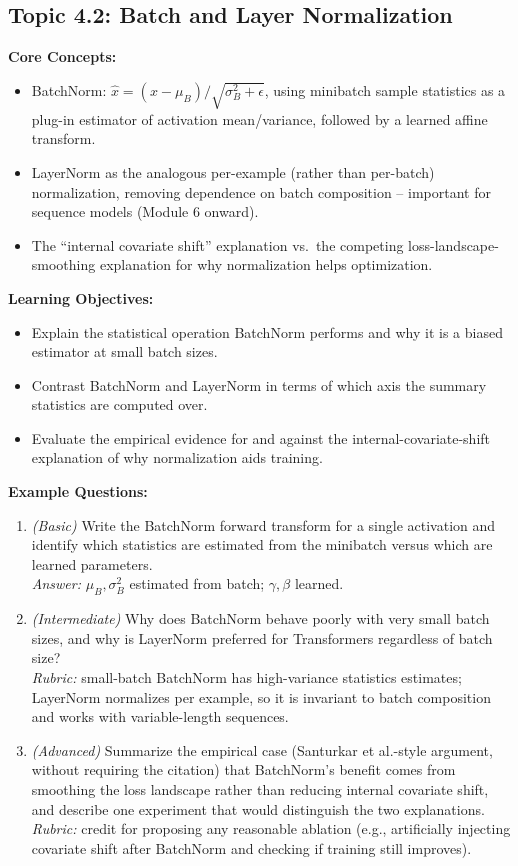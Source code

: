 \documentclass[11pt]{article}
\begin{document}
\subsection{Topic 4.2: Batch and Layer Normalization}

\textbf{Core Concepts:}
\begin{itemize}
  \item BatchNorm: $\hat x = (x - \mu_B)/\sqrt{\sigma_B^2 + \epsilon}$, using minibatch sample statistics as a plug-in estimator of activation mean/variance, followed by a learned affine transform.
  \item LayerNorm as the analogous per-example (rather than per-batch) normalization, removing dependence on batch composition -- important for sequence models (Module 6 onward).
  \item The ``internal covariate shift'' explanation vs.\ the competing loss-landscape-smoothing explanation for why normalization helps optimization.
\end{itemize}

\textbf{Learning Objectives:}
\begin{itemize}
  \item Explain the statistical operation BatchNorm performs and why it is a biased estimator at small batch sizes.
  \item Contrast BatchNorm and LayerNorm in terms of which axis the summary statistics are computed over.
  \item Evaluate the empirical evidence for and against the internal-covariate-shift explanation of why normalization aids training.
\end{itemize}

\textbf{Example Questions:}
\begin{enumerate}
  \item \textit{(Basic)} Write the BatchNorm forward transform for a single activation and identify which statistics are estimated from the minibatch versus which are learned parameters. \\
  \textit{Answer:} $\mu_B, \sigma_B^2$ estimated from batch; $\gamma, \beta$ learned.
  \item \textit{(Intermediate)} Why does BatchNorm behave poorly with very small batch sizes, and why is LayerNorm preferred for Transformers regardless of batch size? \\
  \textit{Rubric:} small-batch BatchNorm has high-variance statistics estimates; LayerNorm normalizes per example, so it is invariant to batch composition and works with variable-length sequences.
  \item \textit{(Advanced)} Summarize the empirical case (Santurkar et al.-style argument, without requiring the citation) that BatchNorm's benefit comes from smoothing the loss landscape rather than reducing internal covariate shift, and describe one experiment that would distinguish the two explanations. \\
  \textit{Rubric:} credit for proposing any reasonable ablation (e.g., artificially injecting covariate shift after BatchNorm and checking if training still improves).
\end{enumerate}
\end{document}
